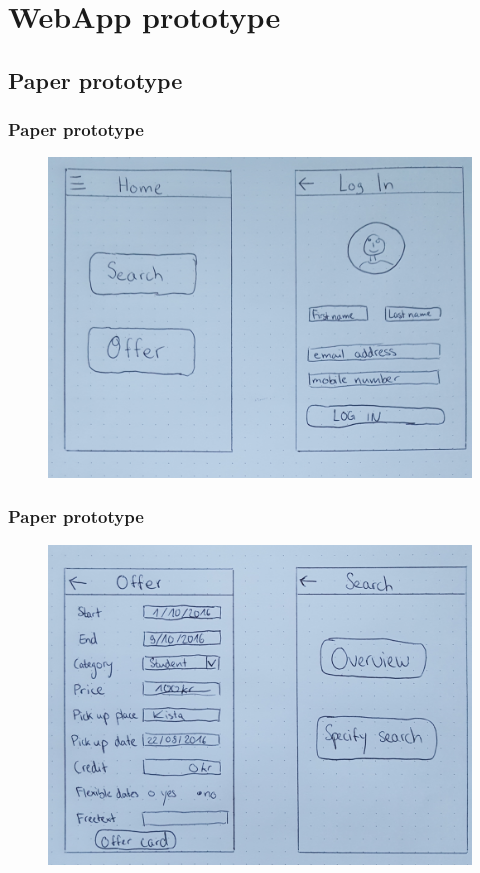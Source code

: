 \documentclass{beamer}
\begin{document}

\section{WebApp prototype} %


\subsection{Paper prototype} %


\begin{frame}
\frametitle{Paper prototype}
\begin{figure}
\includegraphics[width=0.8\linewidth]{jpg/paper-prototype-1-a}
\end{figure}
\end{frame}


\begin{frame}
\frametitle{Paper prototype}
\begin{figure}
\includegraphics[width=0.8\linewidth]{jpg/paper-prototype-1-b}
\end{figure}
\end{frame}
\end{document}
